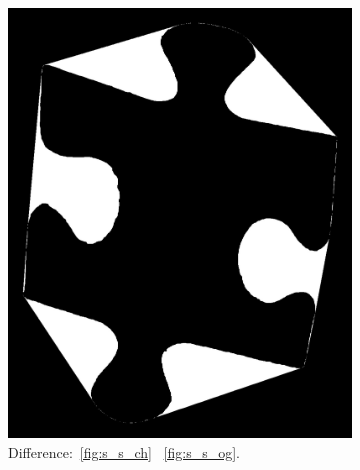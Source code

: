 \documentclass{article}
\begin{document}
\begin{figure}
\begin{subfigure}{0.3\textwidth}
    \includegraphics[width=\linewidth]{pictures/remove_holes_filler_areas.png}
    \caption{Difference:~\cref{fig:s_s_ch} \textminus~\cref{fig:s_s_og}.}
    \label{fig:fig:s_s_og_minus_ch}
  \end{subfigure}
  \vspace{1cm}
  \begin{subfigure}{0.3\textwidth}
    \centering

\end{subfigure}
\end{figure}
\end{document}
